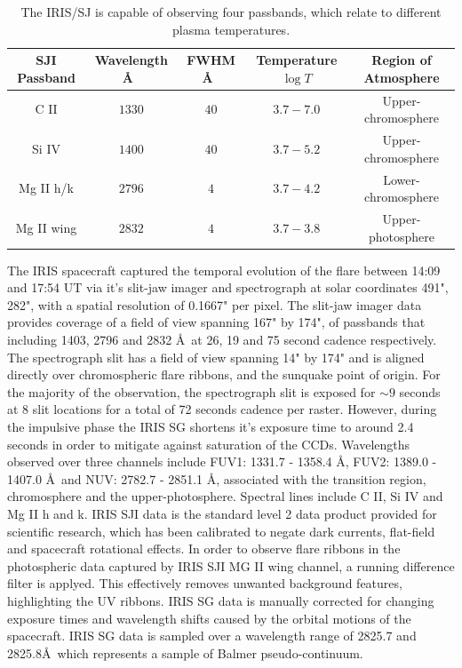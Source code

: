 \documentclass[11pt]{article}
\begin{document}
\begin{table}[H]
\centering
\begin{tabular}{|c|c|c|c|c|}
SJI Passband & Wavelength \AA\ & FWHM \AA\ & Temperature $\log{T}$ & Region of Atmosphere\\
\hline
C II  & $1330$ & $40$ & $3.7 - 7.0$ & Upper-chromosphere\\
Si IV  & $1400$ & $40$ & $3.7 - 5.2$ & Upper-chromosphere\\
Mg II h/k & $2796$ & $4$ & $3.7 - 4.2$ & Lower-chromosphere\\
Mg II wing & $2832$ & $4$ & $3.7 - 3.8$ & Upper-photosphere\\
\end{tabular}
\caption{The IRIS/SJ is capable of observing four passbands, which relate to different plasma temperatures.}\label{iris-sj}
\end{table}


The IRIS spacecraft captured the temporal evolution of the flare between 14:09 and 17:54 UT via it's slit-jaw imager and spectrograph at solar coordinates 491", 282", with a spatial resolution of 0.1667" per pixel. The slit-jaw imager data provides coverage of a field of view spanning 167" by 174", of passbands that including 1403, 2796 and 2832 \AA\ at 26, 19 and 75 second cadence respectively. The spectrograph slit has a field of view spanning 14" by 174" and is aligned directly over chromospheric flare ribbons, and the sunquake point of origin. For the majority of the observation, the spectrograph slit is exposed for $\sim9$ seconds at 8 slit locations for a total of 72 seconds cadence per raster. However, during the impulsive phase the IRIS SG shortens it's exposure time to around 2.4 seconds in order to mitigate against saturation of the CCDs. Wavelengths observed over three channels include FUV1: 1331.7 - 1358.4 \AA, FUV2: 1389.0 - 1407.0 \AA\ and NUV: 2782.7 - 2851.1 \AA, associated with the transition region, chromosphere and the upper-photosphere. Spectral lines include C II, Si IV and Mg II h and k. IRIS SJI data is the standard level 2 data product provided for scientific research, which has been calibrated to negate dark currents, flat-field and spacecraft rotational effects. In order to observe flare ribbons in the photospheric data captured by IRIS SJI MG II wing channel, a running difference filter is applyed. This effectively removes unwanted background features, highlighting the UV ribbons. IRIS SG data is manually corrected for changing exposure times and wavelength shifts caused by the orbital motions of the spacecraft. IRIS SG data is sampled over a wavelength range of 2825.7 and 2825.8\AA\ which represents a sample of Balmer pseudo-continuum. 
\end{document}
